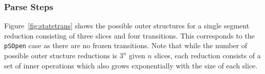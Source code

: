 \documentclass[12pt,a4paper,twoside,openright]{report}
\theoremstyle{definition}
\begin{document}

\subsubsection{Parse Steps}

Figure~\ref{fig:statetrans} shows the possible outer structures for a single segment reduction consisting of three slices and four transitions. 
This corresponds to the \texttt{pSOpen} case as there are no frozen transitions. 
Note that while the number of possible outer stucture reductions is $3^n$ given $n$ slices, each reduction consists of a set of inner operations which also grows exponentially with the size of each slice.  
\end{document}
